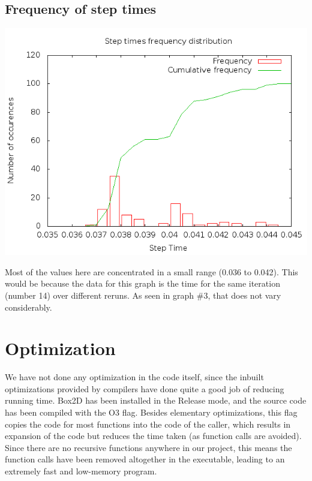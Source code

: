 \documentclass[a4paper,11pt]{article}
\begin{document}
		\subsection{Frequency of step times}
			\begin{center}
				\includegraphics[scale=0.5]{./doc/images/g16_plot05.png}
			\end{center}
			
			Most of the values here are concentrated in a small range (0.036 to
			0.042). This would be because the data for this graph is the time
			for the same iteration (number 14) over different reruns. As seen
			in graph $\#3$, that does not vary considerably.
	
	\section{Optimization}
		We have not done any optimization in the code itself, since the inbuilt
		optimizations provided by compilers have done quite a good job of
		reducing running time. Box2D has been installed in the Release mode, and
		the source code has been compiled with the O3 flag. Besides elementary
		optimizations, this flag copies the code for most functions into the code
		of the caller, which results in expansion of the code but reduces the
		time taken (as function calls are avoided). Since there are no recursive
		functions anywhere in our project, this means the function calls have
		been removed altogether in the executable, leading to an extremely fast
		and low-memory program.
\end{document}
